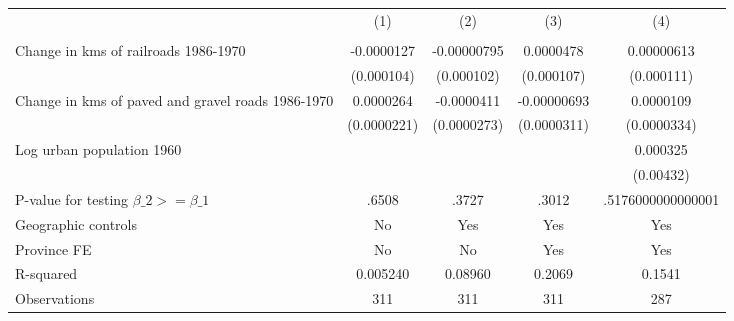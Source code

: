 {
\def\sym#1{\ifmmode^{#1}\else\(^{#1}\)\fi}
\begin{tabular}{l*{4}{c}}
\hline\hline
                &\multicolumn{1}{c}{(1)}&\multicolumn{1}{c}{(2)}&\multicolumn{1}{c}{(3)}&\multicolumn{1}{c}{(4)}\\
                &\multicolumn{1}{c}{}&\multicolumn{1}{c}{}&\multicolumn{1}{c}{}&\multicolumn{1}{c}{}\\
\hline
Change in kms of railroads 1986-1970&-0.0000127         &-0.00000795         &0.0000478         &0.00000613         \\
                &(0.000104)         &(0.000102)         &(0.000107)         &(0.000111)         \\
[1em]
Change in kms of paved and gravel roads 1986-1970&0.0000264         &-0.0000411         &-0.00000693         &0.0000109         \\
                &(0.0000221)         &(0.0000273)         &(0.0000311)         &(0.0000334)         \\
[1em]
Log urban population 1960&                  &                  &                  & 0.000325         \\
                &                  &                  &                  &(0.00432)         \\
\hline
P-value for testing $\beta\_{2} >= \beta\_{1}$&    .6508         &    .3727         &    .3012         &.5176000000000001         \\
Geographic controls&       No         &      Yes         &      Yes         &      Yes         \\
Province FE     &       No         &       No         &      Yes         &      Yes         \\
R-squared       & 0.005240         &  0.08960         &   0.2069         &   0.1541         \\
Observations    &      311         &      311         &      311         &      287         \\
\hline\hline
\end{tabular}
}
